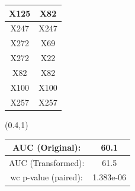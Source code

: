 \documentclass{beamer}
\newcommand{\boz}{\cellcolor{pathwaynode}}
\newcommand{\ghool}{\cellcolor{independentnode}}
\begin{document}
\begin{frame}
\begin{textblock*}{\paperwidth}
\begin{tabular}{| c c |}
\boz X125   &  \boz X82  \\ \hline
X247   &  X247  \\ \hline
\boz X272   &  X69  \\ \hline
\boz X272   &  \boz X22  \\ \hline
\boz X82   &  \boz X82  \\ \hline
X100   &  X100  \\ \hline
\ghool X257   &  \ghool X257  \\ \hline
    \end{tabular}
    \hspace{.5em}
  \end{textblock*}
  \begin{textblock*}{\paperwidth}(0.4\textwidth,1\textheight)
    \raggedright 
    \tiny
    \begin{tabular}{| c c |}
      \hline
AUC (Original): & 60.1 \\ \hline
AUC (Transformed): & 61.5 \\ \hline
      wc p-value (paired): & 1.383e-06 \\ \hline
    \end{tabular}
    \hspace{.5em}
  \end{textblock*}
\end{frame}
\end{document}
